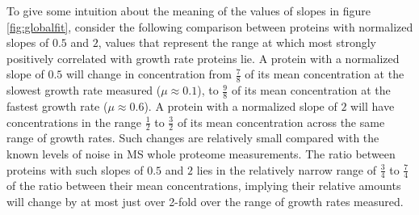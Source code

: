 To give some intuition about the meaning of the values of slopes in figure \ref{fig:globalfit}, consider the following comparison between proteins with normalized slopes of $0.5$ and $2$, values that represent the range at which most strongly positively correlated with growth rate proteins lie.
A protein with a normalized slope of $0.5$ will change in concentration from $\frac{7}{8}$ of its mean concentration at the slowest growth rate measured ($\mu \approx 0.1$), to $\frac{9}{8}$ of its mean concentration at the fastest growth rate ($\mu \approx 0.6$).
A protein with a normalized slope of $2$ will have concentrations in the range $\frac{1}{2}$ to $\frac{3}{2}$ of its mean concentration across the same range of growth rates.
Such changes are relatively small compared with the known levels of noise in MS whole proteome measurements.
The ratio between proteins with such slopes of $0.5$ and $2$ lies in the relatively narrow range of $\frac{3}{4}$ to $\frac{7}{4}$ of the ratio between their mean concentrations, implying their relative amounts will change by at most just over 2-fold over the range of growth rates measured.